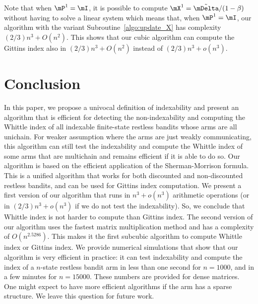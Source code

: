 Note that when $\mP^1=\mI$, it is possible to compute $\mX^1=\tilde{\mDelta}/(1-\beta)$ without having to solve a linear system which means that, when $\mP^1=\mI$, our algorithm with the variant Subroutine~\ref{algo:update_X} has complexity $(2/3) n^3 +O(n^2)$.
This shows that our cubic algorithm can compute the Gittins index also in $(2/3) n^3 +O(n^2)$ instead of $(2/3)n^3 +o(n^3)$.

\section{Conclusion}
\label{sec:conclusion}

In this paper, we propose a univocal definition of indexability and present an algorithm that is efficient for detecting the non-indexability and computing the Whittle index of all indexable finite-state restless bandits whose arms are all unichain. For weaker assumption where the arms are just weakly communicating, this algorithm can still test the indexability and compute the Whittle index of some arms that are multichain and remains efficient if it is able to do so.
Our algorithm is based on the efficient application of the Sherman-Morrison formula. This is a unified algorithm that works for both discounted and non-discounted restless bandits, and can be used for Gittins index computation.  We present a first version of our algorithm that runs in $n^3+o(n^3)$ arithmetic operations (or in $(2/3)n^3+o(n^3)$ if we do not test the indexability). So, we conclude that Whittle index is not harder to compute than Gittins index. The second version of our algorithm uses the fastest matrix multiplication method and has a complexity of $O(n^{2.5286})$. This makes it the first subcubic algorithm to compute Whittle index or Gittins index. We provide numerical simulations that show that our algorithm is very efficient in practice: it can test indexability and compute the index of a $n$-state restless bandit arm in less than one second for $n=1000$, and in a few minutes for $n=15000$. These numbers are provided for dense matrices. One might expect to have more efficient algorithms if the arm has a sparse structure. We leave this question for future work. 


